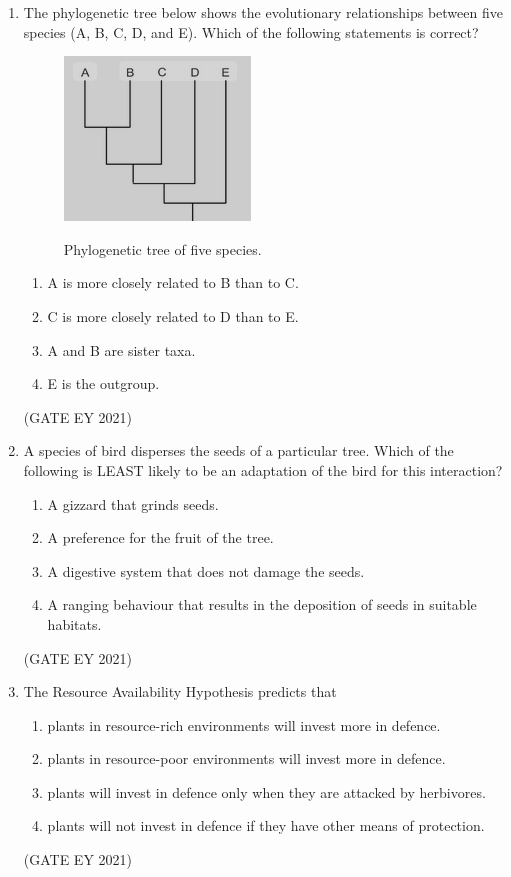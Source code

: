 \documentclass[journal]{IEEEtran}
\begin{document}
\begin{enumerate}
    \item The phylogenetic tree below shows the evolutionary relationships between five species (A, B, C, D, and E). Which of the following statements is correct?
    \begin{figure}[!h]
        \centering
        \includegraphics[width=0.5\columnwidth]{figs/Q.35.png}
        \label{Q.35}
        \caption{Phylogenetic tree of five species.}
    \end{figure}
    \begin{enumerate}
        \item A is more closely related to B than to C.
        \item C is more closely related to D than to E.
        \item A and B are sister taxa.
        \item E is the outgroup.
    \end{enumerate}
    \hfill{(GATE EY 2021)}

    \item A species of bird disperses the seeds of a particular tree. Which of the following is LEAST likely to be an adaptation of the bird for this interaction?
    \begin{enumerate}
        \item A gizzard that grinds seeds.
        \item A preference for the fruit of the tree.
        \item A digestive system that does not damage the seeds.
        \item A ranging behaviour that results in the deposition of seeds in suitable habitats.
    \end{enumerate}
    \hfill{(GATE EY 2021)}

    \item The Resource Availability Hypothesis predicts that
    \begin{enumerate}
        \item plants in resource-rich environments will invest more in defence.
        \item plants in resource-poor environments will invest more in defence.
        \item plants will invest in defence only when they are attacked by herbivores.
        \item plants will not invest in defence if they have other means of protection.
    \end{enumerate}
    \hfill{(GATE EY 2021)}


\end{enumerate}
\end{document}
